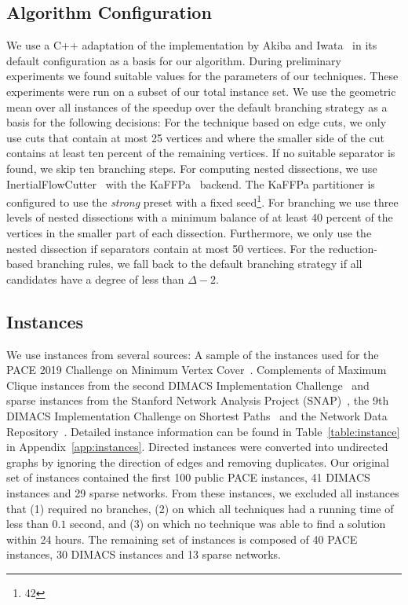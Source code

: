 \documentclass[a4paper,UKenglish,cleveref, autoref, thm-restate]{lipics-v2021}
\begin{document}
\subsection{Algorithm Configuration}\label{sec:algo_conf}
We use a C++ adaptation of the implementation by Akiba and
Iwata~\cite{AkibaIwata} in its default configuration as a basis for our algorithm. During preliminary experiments we found
suitable values for the parameters of
our techniques. These experiments were run on a subset of our total instance
set. We use the geometric mean over all instances of the speedup over the
default branching strategy as a basis for the following decisions: For the technique based on
edge cuts, we only use cuts that contain at most 25 vertices and where the smaller side of
the cut contains at least ten percent of the remaining vertices. If no suitable separator is found, we skip ten branching steps. For computing nested dissections, we use 
InertialFlowCutter~\cite{gottesburen2019faster}
with the KaFFPa~\cite{DBLP:conf/wea/SandersS13}
backend. The KaFFPa partitioner is configured to use the \emph{strong} preset
with a fixed seed\footnote{42}. For branching we use
three levels of nested dissections with a minimum balance of at least 40 percent of the vertices in the smaller part of each dissection. Furthermore, we
only use the nested dissection if separators contain at most
50 vertices. For the reduction-based
branching rules, we fall back to the default branching strategy if all
candidates have a degree of less than $\Delta - 2$. 

\subsection{Instances}
We use instances from several sources: A sample of the instances used for the
PACE 2019 Challenge on Minimum Vertex Cover~\cite{dzulfikar_et_al:LIPIcs:2019:11486}. 
Complements of Maximum Clique instances from the second DIMACS Implementation Challenge~\cite{johnson1993cliques} and sparse instances from
the Stanford Network Analysis Project (SNAP)~\cite{snapnets}, the 9th DIMACS
Implementation Challenge on Shortest Paths~\cite{demetrescu2009shortest} and the
Network Data Repository~\cite{nr}. Detailed instance information can
be found in Table~\ref{table:instance} in Appendix~\ref{app:instances}. Directed instances were converted into
undirected graphs by ignoring the direction of edges and removing duplicates.
Our original set of instances contained the first 100 public PACE instances, 41 DIMACS instances and 29 sparse networks.
From these instances, we excluded all instances that (1) required no branches, (2) on which all techniques had a running time of less than $0.1$ second, and (3) on which no technique was able to find a solution within 24 hours.
The remaining set of instances is composed of 40 PACE instances, 30 DIMACS instances and 13 sparse networks.
\end{document}
